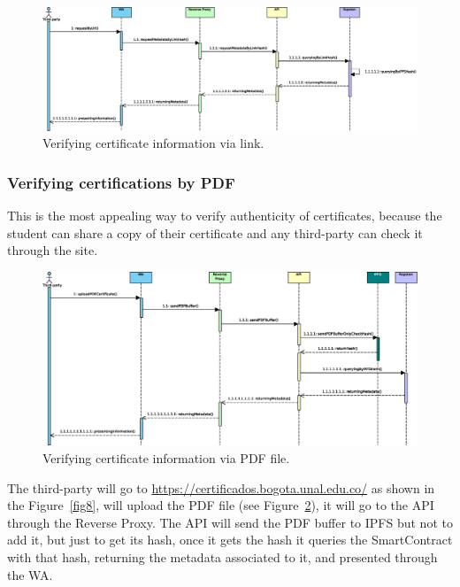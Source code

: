 \documentclass[runningheads]{llncs}
\begin{document}
\begin{figure}
\includegraphics[width=\textwidth]{06-verifying-by-link.eps}
\caption{Verifying certificate information via link.}
\label{fig6}
\end{figure}

\subsubsection{Verifying certifications by PDF} \label{sssec:lbyPDF}
This is the most appealing way to verify authenticity of certificates, because the student can share a copy of their certificate and any third-party can check it through the site.

\begin{figure}
\includegraphics[width=\textwidth]{07-verifying-by-pdf.eps}
\caption{Verifying certificate information via PDF file.}
\label{fig7}
\end{figure}

The third-party will go to \url{https://certificados.bogota.unal.edu.co/} as shown in the Figure~\ref{fig8}, will upload the PDF file (see Figure~\ref{fig7}), it will go to the API through the Reverse Proxy. The API will send the PDF buffer to IPFS but not to add it, but just to get its hash, once it gets the hash it queries the SmartContract with that hash, returning the metadata associated to it, and presented through the WA.
\end{document}

